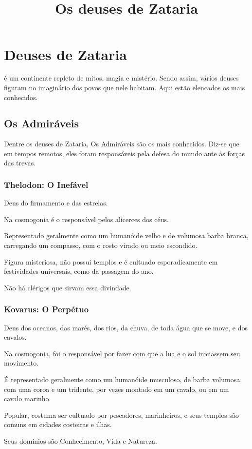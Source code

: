 \documentclass[letterpaper,twocolumn,openany]{dndbook}
\title{Os deuses de Zataria}
\begin{document}
	
	\chapter*{Deuses de Zataria}
	
	 é um continente repleto de mitos, magia e mistério. Sendo assim, vários deuses figuram no imaginário dos povos que nele habitam. Aqui estão elencados os mais conhecidos.
	
	\section{Os Admiráveis}
	Dentre os deuses de Zataria, Os Admiráveis são os mais conhecidos. Diz-se que em tempos remotos, eles foram responsáveis pela defesa do mundo ante às forças das trevas.
	
	\subsection{Thelodon: O Inefável}
	Deus do firmamento e das estrelas.
	\par Na cosmogonia é o responsável pelos alicerces dos céus. 
	\par Representado geralmente como um humanóide velho e de volumosa barba branca, carregando um compasso, com o rosto virado ou meio escondido.
	\par Figura misteriosa, não possui templos e é cultuado esporadicamente em festividades universais, como da passagem do ano.
	\par Não há clérigos que sirvam essa divindade.
	
	\subsection{Kovarus: O Perpétuo}
	Deus dos oceanos, das marés, dos rios, da chuva, de toda água que se move, e dos cavalos.
	\par Na cosmogonia, foi o responsável por fazer com que a lua e o sol iniciassem seu movimento. 
	\par É representado geralmente como um humanóide musculoso, de barba volumosa, com uma coroa e um tridente, por vezes montado em um cavalo, ou em um cavalo marinho.
	\par Popular, costuma ser cultuado por pescadores, marinheiros, e seus templos são comuns em cidades costeiras e ilhas.
	 \par Seus domínios são Conhecimento, Vida e Natureza.
	
\end{document}
